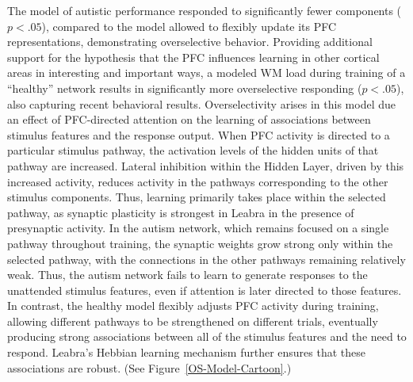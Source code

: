 \documentclass[man]{apa}
\begin{document}
The model of autistic performance responded to significantly fewer components ($p < .05$), compared to the model allowed to flexibly update its PFC representations, demonstrating overselective behavior.  Providing additional support for the hypothesis that the PFC influences learning in other cortical areas in interesting and important ways, a modeled WM load during training of a ``healthy'' network results in significantly more overselective responding ($p < .05$), also capturing recent behavioral results.  Overselectivity arises in this model due an effect of PFC-directed attention on the learning of associations between stimulus features and the response output.  When PFC activity is directed to a particular stimulus pathway, the activation levels of the hidden units of that pathway are increased.  Lateral inhibition within the Hidden Layer, driven by this increased activity, reduces activity in the pathways corresponding to the other stimulus components.  Thus, learning primarily takes place within the selected pathway, as synaptic plasticity is strongest in Leabra in the presence of presynaptic activity.  In the autism network, which remains focused on a single pathway throughout training, the synaptic weights grow strong only within the selected pathway, with the connections in the other pathways remaining relatively weak.  Thus, the autism network fails to learn to generate responses to the unattended stimulus features, even if attention is later directed to those features.  In contrast, the healthy model flexibly adjusts PFC activity during training, allowing different pathways to be strengthened on different trials, eventually producing strong associations between all of the stimulus features and the need to respond.  Leabra's Hebbian learning mechanism further ensures that these associations are robust. (See Figure~\ref{OS-Model-Cartoon}.)
\end{document}
